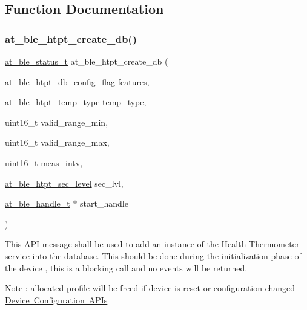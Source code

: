 \subsection{Function Documentation}
\mbox{\label{group__htpt__group_ga2f9864d034b157d76216d1b7284b568b}} 
\subsubsection{\texorpdfstring{at\_ble\_htpt\_create\_db()}{at\_ble\_htpt\_create\_db()}}
{\footnotesize\ttfamily \mbox{\hyperlink{group__error__codes__group_ga3b1db9b95feb157b3c188ca27fe76988}{at\+\_\+ble\+\_\+status\+\_\+t}} at\+\_\+ble\+\_\+htpt\+\_\+create\+\_\+db (\begin{DoxyParamCaption}\item[{\mbox{\hyperlink{at__ble__api_8h_af0538ef74570e97a4abdcc7263fdfcdd}{at\+\_\+ble\+\_\+htpt\+\_\+db\+\_\+config\+\_\+flag}}}]{features,  }\item[{\mbox{\hyperlink{at__ble__api_8h_a236445568b928ababcce95965c981348}{at\+\_\+ble\+\_\+htpt\+\_\+temp\+\_\+type}}}]{temp\+\_\+type,  }\item[{uint16\+\_\+t}]{valid\+\_\+range\+\_\+min,  }\item[{uint16\+\_\+t}]{valid\+\_\+range\+\_\+max,  }\item[{uint16\+\_\+t}]{meas\+\_\+intv,  }\item[{\mbox{\hyperlink{at__ble__api_8h_a3da24809ec703fda904a0a3b4c85e350}{at\+\_\+ble\+\_\+htpt\+\_\+sec\+\_\+level}}}]{sec\+\_\+lvl,  }\item[{\mbox{\hyperlink{at__ble__api_8h_abd23646d0c662860741f787efc8456f2}{at\+\_\+ble\+\_\+handle\+\_\+t}} $\ast$}]{start\+\_\+handle }\end{DoxyParamCaption})}



This A\+PI message shall be used to add an instance of the Health Thermometer service into the database. This should be done during the initialization phase of the device , this is a blocking call and no events will be returned. 

Note \+: allocated profile will be freed if device is reset or configuration changed \mbox{\hyperlink{group__gap__dev__config__group}{Device Configuration A\+P\+Is}}


